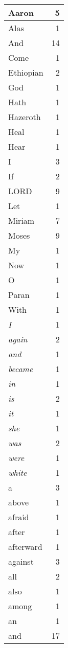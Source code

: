 \begin{center}
\begin{longtable}{l|r}
\hline \hline
\endlastfoot
Aaron & 5 \\ \hline
Alas & 1 \\ \hline
And & 14 \\ \hline
Come & 1 \\ \hline
Ethiopian & 2 \\ \hline
God & 1 \\ \hline
Hath & 1 \\ \hline
Hazeroth & 1 \\ \hline
Heal & 1 \\ \hline
Hear & 1 \\ \hline
I & 3 \\ \hline
If & 2 \\ \hline
LORD & 9 \\ \hline
Let & 1 \\ \hline
Miriam & 7 \\ \hline
Moses & 9 \\ \hline
My & 1 \\ \hline
Now & 1 \\ \hline
O & 1 \\ \hline
Paran & 1 \\ \hline
With & 1 \\ \hline
\emph{I} & 1 \\ \hline
\emph{again} & 2 \\ \hline
\emph{and} & 1 \\ \hline
\emph{became} & 1 \\ \hline
\emph{in} & 1 \\ \hline
\emph{is} & 2 \\ \hline
\emph{it} & 1 \\ \hline
\emph{she} & 1 \\ \hline
\emph{was} & 2 \\ \hline
\emph{were} & 1 \\ \hline
\emph{white} & 1 \\ \hline
a & 3 \\ \hline
above & 1 \\ \hline
afraid & 1 \\ \hline
after & 1 \\ \hline
afterward & 1 \\ \hline
against & 3 \\ \hline
all & 2 \\ \hline
also & 1 \\ \hline
among & 1 \\ \hline
an & 1 \\ \hline
and & 17 \\ \hline

\end{longtable}
\end{center}
